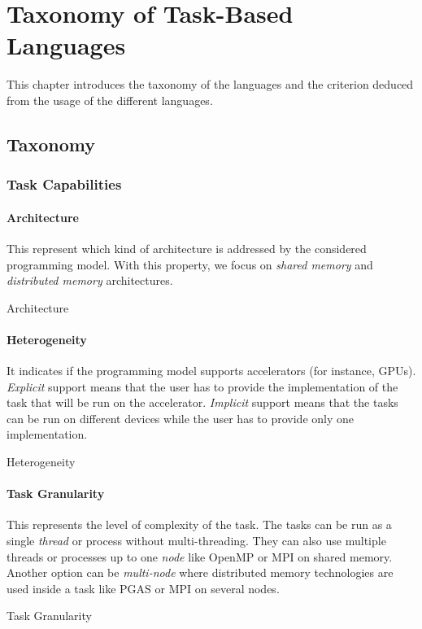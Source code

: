 \chapter{Taxonomy of Task-Based Languages}
\label{chap:taxonomy}

This chapter introduces the taxonomy of the languages and the criterion deduced from the usage of the different languages.

\section{Taxonomy}

\subsection{Task Capabilities}

\subsubsection{Architecture}
This represent which kind of architecture is addressed by the considered programming model.
With this property, we focus on \textit{shared memory} and \textit{distributed memory} architectures.
\begin{table}[H]
	\caption{Architecture}
	\centering
	
\end{table}


\subsubsection{Heterogeneity}
It indicates if the programming model supports accelerators (for instance, GPUs).
\textit{Explicit} support means that the user has to provide the implementation of the task that will be run on the accelerator.
\textit{Implicit} support means that the tasks can be run on different devices while the user has to provide only one implementation.
\begin{table}[H]
	\caption{Heterogeneity}
	\centering
	
\end{table}

\subsubsection{Task Granularity}
This represents the level of complexity of the task.
The tasks can be run as a single \textit{thread} or process without multi-threading.
They can also use multiple threads or processes up to one \textit{node} like OpenMP or MPI on shared memory.
Another option can be \textit{multi-node} where distributed memory technologies are used inside a task like PGAS or MPI on several nodes.
\begin{table}[H]
	\caption{Task Granularity}
	\centering
	
\end{table}

